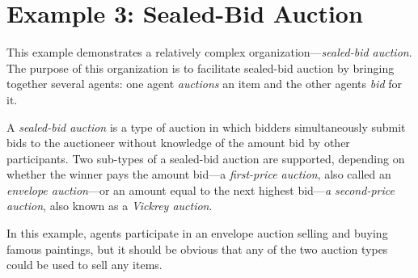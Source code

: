 
\section{Example 3: Sealed-Bid Auction}

This example demonstrates a relatively complex organization---\textit{sealed-bid auction}.
The purpose of this organization is to facilitate sealed-bid auction by bringing together several agents: one agent \textit{auctions} an item and the other agents \textit{bid} for it.

A \textit{sealed-bid auction} is a type of auction in which bidders simultaneously submit bids to the auctioneer without knowledge of the amount bid by other participants.
Two sub-types of a sealed-bid auction are supported, depending on whether the winner pays the amount bid---a \textit{first-price auction}, also called an \textit{envelope auction}---or an amount equal to the next highest bid---\textit{a second-price auction}, also known as a \textit{Vickrey auction}.


In this example, agents participate in an envelope auction selling and buying famous paintings, but it should be obvious that any of the two auction types could be used to sell any items.

